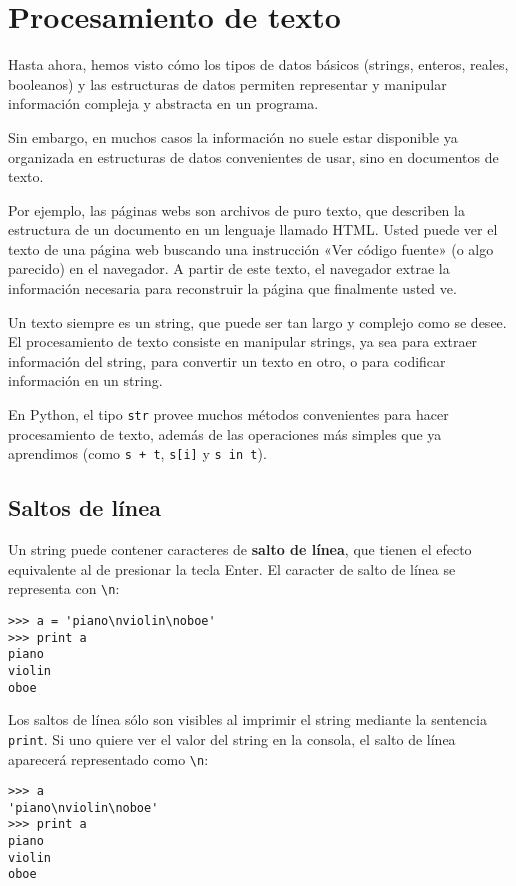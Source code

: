 \chapter{Procesamiento de texto}

Hasta ahora, hemos visto cómo los tipos de datos básicos (strings,
enteros, reales, booleanos) y las estructuras de datos permiten
representar y manipular información compleja y abstracta en un programa.

Sin embargo, en muchos casos la información no suele estar disponible ya
organizada en estructuras de datos convenientes de usar, sino en
documentos de texto.

Por ejemplo, las páginas webs son archivos de puro texto, que describen
la estructura de un documento en un lenguaje llamado HTML. Usted puede
ver el texto de una página web buscando una instrucción «Ver código
fuente» (o algo parecido) en el navegador. A partir de este texto, el
navegador extrae la información necesaria para reconstruir la página que
finalmente usted ve.

Un texto siempre es un string, que puede ser tan largo y complejo como
se desee. El procesamiento de texto consiste en manipular strings, ya
sea para extraer información del string, para convertir un texto en
otro, o para codificar información en un string.

En Python, el tipo \lstinline!str! provee muchos métodos convenientes
para hacer procesamiento de texto, además de las operaciones más simples
que ya aprendimos (como \lstinline!s + t!, \lstinline!s[i]! y
\lstinline!s in t!).

\section{Saltos de línea}

Un string puede contener caracteres de \textbf{salto de línea}, que
tienen el efecto equivalente al de presionar la tecla Enter. El caracter
de salto de línea se representa con \lstinline!\n!:

\begin{lstlisting}
>>> a = 'piano\nviolin\noboe'
>>> print a
piano
violin
oboe
\end{lstlisting}

Los saltos de línea sólo son visibles al imprimir el string mediante la
sentencia \lstinline!print!. Si uno quiere ver el valor del string en la
consola, el salto de línea aparecerá representado como \lstinline!\n!:

\begin{lstlisting}
>>> a
'piano\nviolin\noboe'
>>> print a
piano
violin
oboe
\end{lstlisting}


